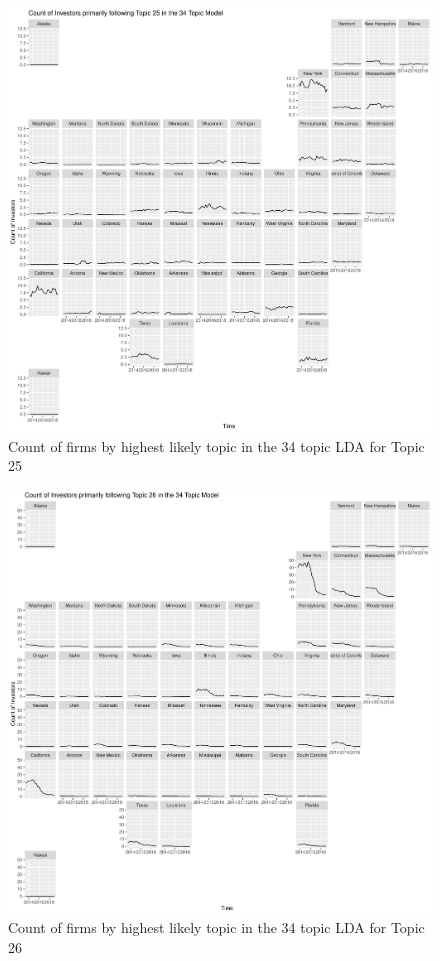 \begin{figure}
	\centering
	\includegraphics[width=1\linewidth]{Figures/ChapterV/USA_34_Topic25.pdf}
	\caption[Count of firm for Topic 25 by quarter]{Count of firms by highest likely topic in the 34 topic LDA for Topic 25}
	\label{fig:StateLDA25}
\end{figure}

\begin{figure}
	\centering
	\includegraphics[width=1\linewidth]{Figures/ChapterV/USA_34_Topic26.pdf}
	\caption[Count of firm for Topic 26 by quarter]{Count of firms by highest likely topic in the 34 topic LDA for Topic 26}
	\label{fig:StateLDA26}
\end{figure}

